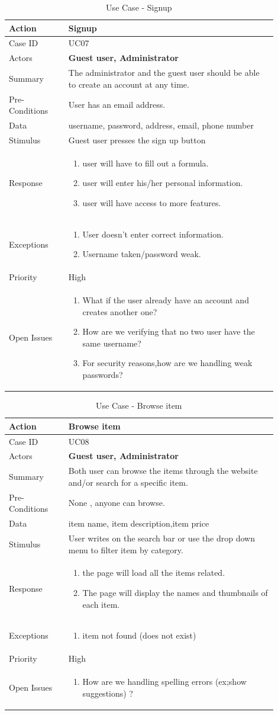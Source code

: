 \documentclass[11pt]{article}
\newcounter{use case ID}
\newcommand\tabularhead[1]{
    \begin{table}[ht]
        \addtocounter{use case ID}{1}
        \caption{Use Case \arabic{use case ID} - #1}
        \vspace{0.2cm}
        \begin{tabular}{|p{0.2\linewidth}|p{0.70\linewidth}|}
            \hline
            \textbf{Action} & \textbf{#1} \\
            \hline}
\newcommand\addrow[2]{#1 & #2\\ \hline}
\newcommand\addmulrow[2]{ \begin{minipage}[t][][t]{2.5cm}#1\end{minipage}
                &\begin{minipage}[t][][t]{11cm}
                    \begin{enumerate}[itemsep=-1ex] #2   \end{enumerate}
                \end{minipage}\vfill\\ \hline}
\newenvironment{usecase}{\tabularhead}
        {\hline\end{tabular}\end{table}}
\begin{document}
\begin{usecase}{Signup}
    \addrow{Case ID}{UC07}
    \addrow{Actors}{\textbf{Guest user, Administrator}}
    \addrow{Summary}{The \index{administrator}administrator and the \index{guest user}guest user should be able to create an account at any time.}
    \addrow{Pre-Conditions}{
       User has an email address.
        }
    \addrow{\index{data}Data}{
username, password, address, email, phone number
}
    \addrow{Stimulus}{\index{guest user}Guest user presses the sign up button}
    \addmulrow{Response}{
        \item user will have to fill out a formula.
        \item user will enter his/her personal \index{information}information.
        \item user will have access to more features.
    }
    \addmulrow{Exceptions}{
        \item User doesn't enter correct \index{information}information.
        \item Username taken/password weak.
    }
    \addrow{Priority}{High}
    \addmulrow{Open Issues}{
        \item What if the user already have an account and creates another one?
        \item How are we verifying that no two user have the same username?
        \item For security reasons,how are we handling weak passwords?
    }
\end{usecase}

\begin{usecase}{Browse item}
    \addrow{Case ID}{UC08}
    \addrow{Actors}{\textbf{Guest user, Administrator}}
    \addrow{Summary}{Both user can browse the items through the website and/or search for a specific item.}
    \addrow{Pre-Conditions}{
       None , anyone can browse.
        }
    \addrow{\index{data}Data}{
    item name, item description,item price}
    \addrow{Stimulus}{User writes on the search bar or use the drop down menu to filter item by category. }
    \addmulrow{Response}{
        \item the page will load all the items related.
        \item The page will display the names and thumbnails of each item.
    }
    \addmulrow{Exceptions}{
        \item item not found (does not exist)
    }
    \addrow{Priority}{High}
    \addmulrow{Open Issues}{
        \item How are we handling spelling errors (ex;show suggestions) ?
    }
\end{usecase}
\end{document}
